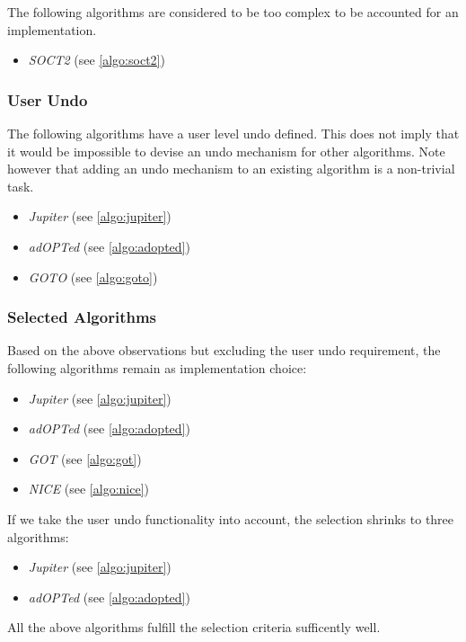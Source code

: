 The following algorithms are considered to be too complex to be accounted for an implementation.
\begin{itemize}
 \item \emph{SOCT2} (see \ref{algo:soct2})
\end{itemize}


\subsubsection{User Undo}
The following algorithms have a user level undo defined. This does not imply that it would be impossible to devise an undo mechanism for other algorithms. Note however that adding an undo mechanism to an existing algorithm is a non-trivial task.

\begin{itemize}
 \item \emph{Jupiter} (see \ref{algo:jupiter}) 
 \item \emph{adOPTed} (see \ref{algo:adopted})
 \item \emph{GOTO} (see \ref{algo:goto})
\end{itemize}


\subsubsection{Selected Algorithms}
Based on the above observations but excluding the user undo requirement, the following algorithms remain as implementation choice:

\begin{itemize}
 \item \emph{Jupiter} (see \ref{algo:jupiter})
 \item \emph{adOPTed} (see \ref{algo:adopted})
 \item \emph{GOT} (see \ref{algo:got})
 \item \emph{NICE} (see \ref{algo:nice})
\end{itemize}

If we take the user undo functionality into account, the selection shrinks to three algorithms:
\begin{itemize}
 \item \emph{Jupiter} (see \ref{algo:jupiter}) 
 \item \emph{adOPTed} (see \ref{algo:adopted})
\end{itemize}

All the above algorithms fulfill the selection criteria sufficently well.
